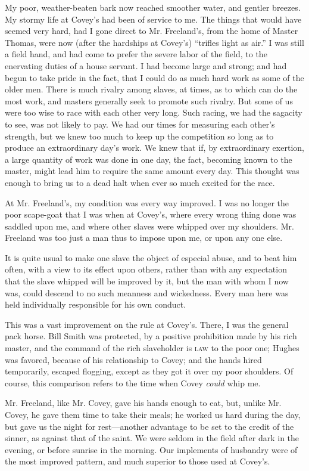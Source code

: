 My poor, weather-beaten bark now reached smoother water, and gentler
breezes. My stormy life at Covey's had been of service to me. The things
that would have seemed very hard, had I gone direct to Mr. Freeland's,
from the home of Master Thomas, were now (after the hardships at
Covey's) ``trifles light as air.'' I was still a field hand, and had
come to prefer the severe labor of the field, to the enervating duties
of a house servant. I had become large and strong; and had begun to take
pride in the fact, that I could do as much hard work as some of the
older men. There is much rivalry among slaves, at times, as to which can
do the most work, and masters generally seek to promote such rivalry.
But some of us were too wise to race with each other very long. Such
racing, we had the sagacity to see, was not likely to pay. We had our
times for measuring {\protect\hypertarget{262}{}{}}each other's
strength, but we knew too much to keep up the competition so long as to
produce an extraordinary day's work. We knew that if, by extraordinary
exertion, a large quantity of work was done in one day, the fact,
becoming known to the master, might lead him to require the same amount
every day. This thought was enough to bring us to a dead halt when ever
so much excited for the race.

At Mr. Freeland's, my condition was every way improved. I was no longer
the poor scape-goat that I was when at Covey's, where every wrong thing
done was saddled upon me, and where other slaves were whipped over my
shoulders. Mr. Freeland was too just a man thus to impose upon me, or
upon any one else.

It is quite usual to make one slave the object of especial abuse, and to
beat him often, with a view to its effect upon others, rather than with
any expectation that the slave whipped will be improved by it, but the
man with whom I now was, could descend to no such meanness and
wickedness. Every man here was held individually responsible for his own
conduct.

This was a vast improvement on the rule at Covey's. There, I was the
general pack horse. Bill Smith was protected, by a positive prohibition
made by his rich master, and the command of the rich slaveholder is
\textsc{law} to the poor one; Hughes was favored, because of his
relationship to Covey; and the hands hired temporarily, escaped
flogging, except as they got it over my poor shoulders. Of course, this
comparison refers to the time when Covey \emph{could} whip me.

Mr. Freeland, like Mr. Covey, gave his hands enough to eat, but, unlike
Mr. Covey, he gave them {\protect\hypertarget{263}{}{}}time to take
their meals; he worked us hard during the day, but gave us the night for
rest---another advantage to be set to the credit of the sinner, as
against that of the saint. We were seldom in the field after dark in the
evening, or before sunrise in the morning. Our implements of husbandry
were of the most improved pattern, and much superior to those used at
Covey's.

